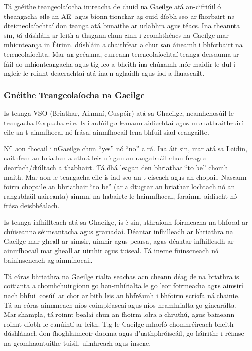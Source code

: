 \begin{multicols}{2}
Tá gnéithe teangeolaíocha intreacha de chuid na Gaeilge atá an-difriúil ó theangacha eile an AE, agus bíonn tionchar ag cuid díobh seo ar fhorbairt na dteicneolaíochtaí don teanga atá bunaithe ar urlabhra agus téacs. Ina theannta sin, tá dúshláin ar leith a thagann chun cinn i gcomhthéacs na Gaeilge mar mhionteanga in Éirinn, dúshláin a chaithfear a chur san áireamh i bhforbairt na teicneolaíochta. Mar an gcéanna, cuireann teicneolaíochtaí teanga deiseanna ar fáil do mhionteangacha agus tig leo a bheith ina chúnamh mór maidir le dul i ngleic le roinnt deacrachtaí atá ina n-aghaidh agus iad a fhuascailt.

\subsubsection{Gnéithe Teangeolaíocha na Gaeilge}

Is teanga VSO (Briathar, Ainmní, Cuspóir) atá sa Ghaeilge, neamhchosúil le teangacha Eorpacha eile. Is iondúil go leanann aidiachtaí agus mionathraitheoirí eile an t-ainmfhocal nó frásaí ainmfhocail lena bhfuil siad ceangailte.


Níl aon fhocail i nGaeilge chun “yes” nó “no” a rá. Ina áit sin, mar atá sa Laidin, caithfear an briathar a athrá leis nó gan an rangabháil chun freagra dearfach/diúltach a thabhairt. Tá dhá leagan den bhriathar “to be” chomh maith. Mar aon le teangacha eile is iad seo an t-eiseach agus an chopail. Nascann foirm chopaile an bhriathair “to be” (ar a dtugtar an briathar lochtach nó an rangabháil uaireanta) ainmní na habairte le hainmfhocal, forainm, aidiacht nó frása deisbhéalach.

Is teanga infhillteach atá sa Ghaeilge, is é sin, athraíonn foirmeacha na bhfocal ar chúiseanna séimeantacha agus gramadaí. Déantar infhilleadh ar bhriathra na Gaeilge mar gheall ar aimsir, uimhir agus pearsa, agus déantar infhilleadh ar ainmfhocail mar gheall ar uimhir agus tuiseal.  Tá inscne firinscneach nó baininscneach ag ainmfhocail.

Tá córas bhriathra na Gaeilge rialta seachas aon cheann déag de na briathra is coitianta a chomhchuingíonn go han-mhírialta le go leor foirmeacha agus aimsirí nach bhfuil cosúil ar chor ar bith leis an bhfréamh i bhfoirm scríofa ná chainte. Tá an córas ainmneach níos coimpléascaí agus níos neamhrialta go ginearálta. Mar shampla, tá roinnt bealaí chun an fhoirm iolra a chruthú, agus baineann roinnt díobh le canúintí ar leith. Tig le Gaeilge mhorfó-chomhréireach bheith dúshlánach don fhoghlaimeoir daonna agus d’uathphróiseáil, go háirithe i réimse na gcomhaontuithe tuisil, uimhreach agus inscne.


\end{multicols}
